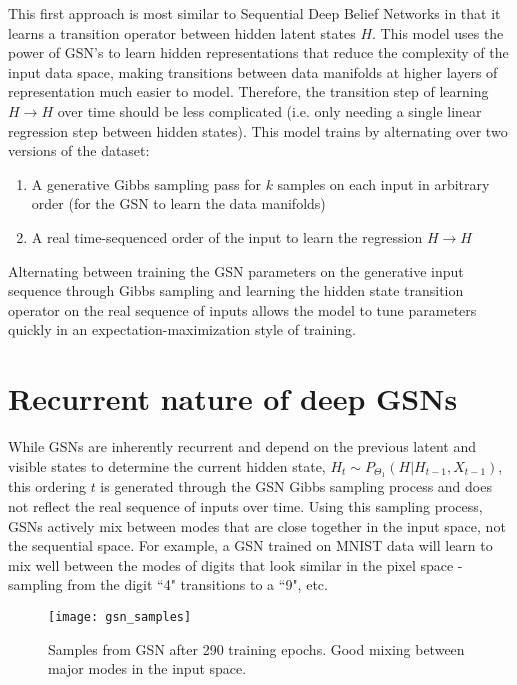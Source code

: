This first approach is most similar to Sequential Deep Belief Networks in that it learns a transition operator between hidden latent states \(H\). This model uses the power of GSN's to learn hidden representations that reduce the complexity of the input data space, making transitions between data manifolds at higher layers of representation much easier to model. Therefore, the transition step of learning \(H \rightarrow H\) over time should be less complicated (i.e. only needing a single linear regression step between hidden states). This model trains by alternating over two versions of the dataset:
\begin{enumerate}
\item A generative Gibbs sampling pass for \(k\) samples on each input in arbitrary order (for the GSN to learn the data manifolds)
\item A real time-sequenced order of the input to learn the regression \(H \rightarrow H\)
\end{enumerate}
Alternating between training the GSN parameters on the generative input sequence through Gibbs sampling and learning the hidden state transition operator on the real sequence of inputs allows the model to tune parameters quickly in an expectation-maximization style of training.



\section{Recurrent nature of deep GSNs}

While GSNs are inherently recurrent and depend on the previous latent and visible states to determine the current hidden state, \(H_{t} \sim P_{\Theta_1}(H|H_{t-1},X_{t-1})\), this ordering \(t\) is generated through the GSN Gibbs sampling process and does not reflect the real sequence of inputs over time. Using this sampling process, GSNs actively mix between modes that are close together in the input space, not the sequential space. For example, a GSN trained on MNIST data will learn to mix well between the modes of digits that look similar in the pixel space - sampling from the digit ``4" transitions to a ``9", etc.

\begin{figure}[h!]
  \centering
    \texttt{[image: gsn\_samples]}
\caption{Samples from GSN after 290 training epochs. Good mixing between major modes in the input space.}
\end{figure}


